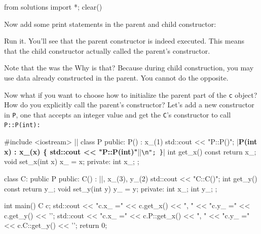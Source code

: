 \begin{python0}
from solutions import *; clear()
\end{python0}

Now add some print statements in the parent and child constructor:

Run it. You'll see that the parent constructor is indeed executed. This means that the child constructor actually called the parent's constructor.

Note that the  was  the  Why is that? Because during child construction, you may use data already constructed in the parent. You cannot do the opposite.

Now what if you want to choose how to initialize the parent part of the
\verb!c! object? How do you explicitly call the parent's constructor?
Let's add a new constructor in \verb!P!, one that accepts an integer
value and get the \verb!C!'s constructor to call \verb!P::P(int):!
\begin{consolethree}[escapeinside=||]
#include <iostream>
||
class P
{
public:
        P() : x_(1) { std::cout << "P::P()\n"; }
        |\textbf{P(int x) : x\_(x) \{ std::cout << "P::P(int)"}||\verb!\n"; }!|
        int get_x() const { return x_; }
        void set_x(int x) { x_ = x; }
private:
        int x_;
};

class C: public P
{
public:
        C() : ||, x_(3), y_(2)
                     { std::cout << "C::C()"; }
        int get_y() const { return y_; }
        void set_y(int y) { y_ = y; }
private:
        int x_;
        int y_;
};

int main()
{   
    C c;
    std::cout << "c.x_ =" << c.get_x() << ", "
              << "c.y_ =" << c.get_y() << '\n';
    std::cout << "c.x_ =" << c.P::get_x() << ", "
              << "c.y_ =" << c.C::get_y() << '\n';
    return 0;
}
\end{consolethree}

